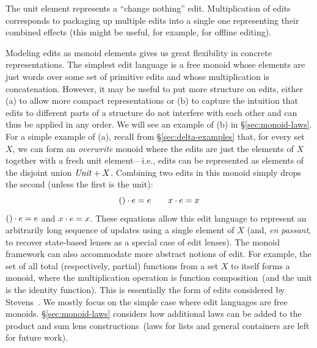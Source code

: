 The unit element represents a ``change nothing'' edit.  Multiplication of
edits corresponds to packaging up multiple edits into a single one
representing their combined effects\iffull{} (this might be useful, for example, for
offline editing)\fi.

Modeling edits as monoid elements gives us great flexibility in 
concrete representations.
%
The simplest edit language is a {free monoid} whose elements are just words
over some set of primitive edits and whose multiplication is
concatenation.  
%
However, it may be useful to put 
more structure on edits, either (a) to allow 
more compact representations or (b) to capture the intuition that edits to
different parts of a structure do not interfere with each other and can thus
be applied in any order.  We will see an example of (b) in 
\S \ref{sec:monoid-laws}. For a simple example of 
(a), recall from
\S \ref{sec:delta-examples} that, for every set $X$, we can form an {\em
  overwrite} monoid where the edits are just the elements of $X$ together
with a fresh unit element---i.e., edits can be represented as elements of
the disjoint union $\mathit{Unit} + X$. Combining two edits in this monoid
simply drops the second (unless the first is the unit):
\iffull
\[
{{()}} \cdot e = e \qquad
{x} \cdot e =  x
\]
\else
${{()}} \cdot e = e$ and ${x} \cdot e =  x$.
\fi
These equations allow this edit language to represent an arbitrarily long
sequence of updates using a single element of $X$ (and, {\em en passant}, to
recover state-based lenses as a special case of edit lenses). \iflater{}\fi
%
The monoid framework can also accommodate more abstract notions of edit.  For
example, the set of all total \iffull(respectively, partial) \fi
functions from a set $X$ to itself forms a monoid, where the multiplication
operation is function composition\iffull\ (and the unit is the
identity function)\fi. This is essentially the form of edits considered by
Stevens~\cite{stevens2008tat}\iflater{}\fi.  \iflater{}\fi
%
We mostly focus on the simple case where edit languages are free monoids.
\S \ref{sec:monoid-laws} considers how additional laws can be added to the
product and sum lens constructions\iffull\ (laws for lists and general
containers are left for future work)\fi.

